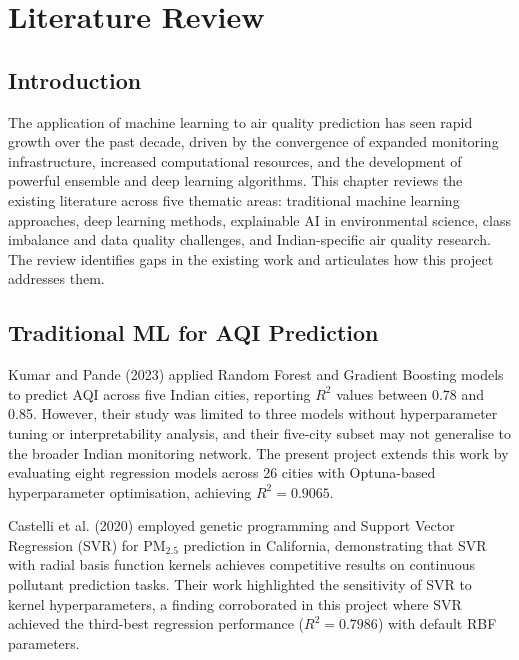 \documentclass[12pt,a4paper]{report}
\begin{document}
\clearpage
\chapter{Literature Review}\label{idx:ch3}

\section{Introduction}

The application of machine learning to air quality prediction has seen rapid growth over the past decade, driven by the convergence of expanded monitoring infrastructure, increased computational resources, and the development of powerful ensemble and deep learning algorithms. This chapter reviews the existing literature across five thematic areas: traditional machine learning approaches, deep learning methods, explainable AI in environmental science, class imbalance and data quality challenges, and Indian-specific air quality research. The review identifies gaps in the existing work and articulates how this project addresses them.

\section{Traditional ML for AQI Prediction}

Kumar and Pande (2023) applied Random Forest and Gradient Boosting models to predict AQI across five Indian cities, reporting $R^2$ values between 0.78 and 0.85. However, their study was limited to three models without hyperparameter tuning or interpretability analysis, and their five-city subset may not generalise to the broader Indian monitoring network. The present project extends this work by evaluating eight regression models across 26 cities with Optuna-based hyperparameter optimisation, achieving $R^2 = 0.9065$.

Castelli et al. (2020) employed genetic programming and Support Vector Regression (SVR) for PM$_{2.5}$ prediction in California, demonstrating that SVR with radial basis function kernels achieves competitive results on continuous pollutant prediction tasks. Their work highlighted the sensitivity of SVR to kernel hyperparameters, a finding corroborated in this project where SVR achieved the third-best regression performance ($R^2 = 0.7986$) with default RBF parameters.
\end{document}
